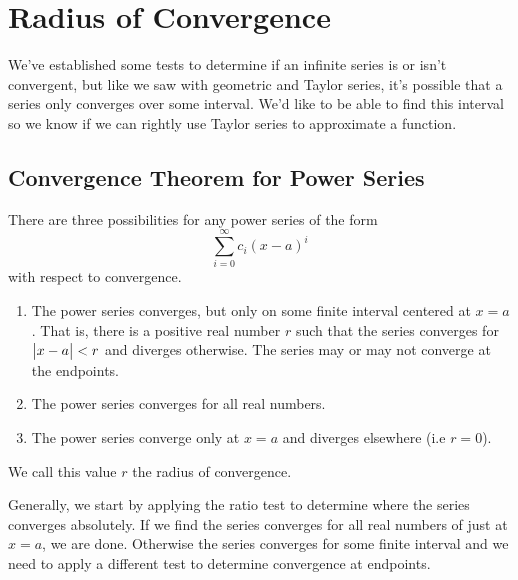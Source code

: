 \section{Radius of Convergence}
We've established some tests to determine if an infinite series is or isn't convergent, but like we saw with geometric and Taylor series, it's possible that a series only converges over some interval.
We'd like to be able to find this interval so we know if we can rightly use Taylor series to approximate a function.

\subsection{Convergence Theorem for Power Series}
\begin{theorem}
	There are three possibilities for any power series of the form
	\begin{equation*}
		\sum_{i=0}^{\infty}{c_i(x-a)^i}
	\end{equation*}
	with respect to convergence.
	\begin{enumerate}
		\item The power series converges, but only on some finite interval centered at $x=a$.
			That is, there is a positive real number $r$ such that the series converges for $\big\lvert x-a \big\rvert<r$ and diverges otherwise.
			The series may or may not converge at the endpoints.
		\item The power series converges for all real numbers.
		\item The power series converge only at $x=a$ and diverges elsewhere (i.e $r=0$).
	\end{enumerate}
	We call this value $r$ the radius of convergence.
\end{theorem}

Generally, we start by applying the ratio test to determine where the series converges absolutely.
If we find the series converges for all real numbers of just at $x=a$, we are done.
Otherwise the series converges for some finite interval and we need to apply a different test to determine convergence at endpoints.

